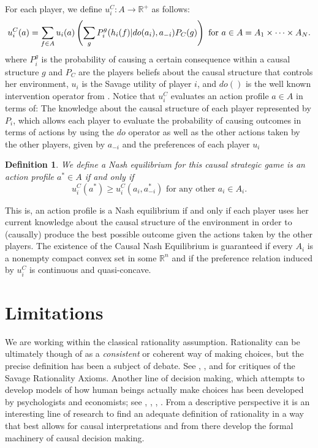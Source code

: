 \documentclass{article}
\theoremstyle{plain}
\newtheorem{defi}[teo]{Definition}
\begin{document}
For each player, we define $u^C_i : A \to \mathbb{R}^{+}$ as follows:
\begin{equation}{\label{causal_ut}}
u^C_i (a) = \sum_{f \in A}  u_i(a) \left( \sum_g P^g_i (h_i(f) | do(a_i), a_{-i}) P_C(g) \right) \textrm{ for } a \in A=A_1 \times \cdots \times A_N.
\end{equation}
where $P^g_i$ is the probability of causing a certain consequence within a causal structure $g$ and $P_C$ are the players beliefs about the causal structure that controls her environment, $u_i$ is the Savage utility of player $i$, and $do()$ is the well known intervention operator from \cite{pearl2009causality}. Notice that $u^C_i$ evaluates an action profile $a \in A$ in terms of: The knowledge about the causal structure of each player represented by $P_i$, which allows each player to evaluate the probability of causing outcomes in terms of actions by using the $do$ operator as well as the other actions taken by the other players, given by $a_{-i}$ and the preferences of each player $u_i$
\begin{defi}
We define a Nash equilibrium for this \textit{causal strategic game} is an action profile $a^\ast \in A$ if and only if
\begin{equation}
 u^C_i(a^\ast) \geq u^C_i(a_i, a^\ast_{-i}) \textrm{ for any other } a_i \in A_i. 
 \end{equation}
\end{defi}
This is, an action profile is a Nash equilibrium if and only if each player uses her current knowledge about the causal structure of the environment in order to (causally) produce the best possible outcome given the actions taken by the other players. The existence of the Causal Nash Equilibrium is guaranteed if every $A_i$ is a nonempty compact convex set in some $\mathbb{R}^n$ and if the preference relation induced by $u^C_i$ is continuous and quasi-concave.
\section{Limitations}
We are working within the classical rationality assumption. Rationality can be ultimately though of as a \textit{consistent} or coherent way of making choices, but the precise definition has been a subject of debate. See \cite{ellsberg1961risk}, \cite{binmore2008rational}, \cite{gilboa2009decision} and \cite{machina2014ambiguity} for critiques of the Savage Rationality Axioms. Another line of decision making, which attempts to develop models of how human beings actually make choices has been developed by psychologists and economists; see \cite{TverskyKahneman74}, \cite{kahneman1979prospect}, \cite{kahneman1982judgment}, \cite{kahneman2000choices}. From a descriptive perspective it is an interesting line of research to find an adequate definition of rationality in a way that best allows for causal interpretations and from there develop the formal machinery of causal decision making.
\end{document}
